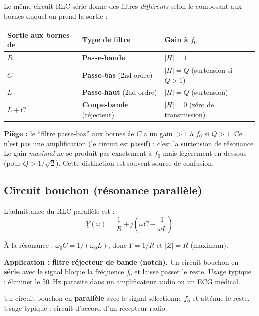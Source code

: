 \documentclass[12pt,a4paper,twoside]{book}
\begin{document}
Le même circuit RLC série donne des filtres \textit{différents} selon le composant aux bornes duquel on prend la sortie :

\begin{center}
\begin{tabular}{lll}
\toprule
\textbf{Sortie aux bornes de} & \textbf{Type de filtre} & \textbf{Gain à $f_0$} \\
\midrule
$R$ & \textbf{Passe-bande} & $|H| = 1$ \\
$C$ & \textbf{Passe-bas} (2nd ordre) & $|H| = Q$ (surtension si $Q > 1$) \\
$L$ & \textbf{Passe-haut} (2nd ordre) & $|H| = Q$ (surtension) \\
$L + C$ & \textbf{Coupe-bande} (réjecteur) & $|H| = 0$ (zéro de transmission) \\
\bottomrule
\end{tabular}
\end{center}

\begin{attention}
\textbf{Piège :} le ``filtre passe-bas'' aux bornes de $C$ a un gain $> 1$ à $f_0$ si $Q > 1$. Ce n'est pas une amplification (le circuit est passif) : c'est la surtension de résonance. Le gain \textit{maximal} ne se produit pas exactement à $f_0$ mais légèrement en dessous (pour $Q > 1/\sqrt{2}$). Cette distinction est souvent source de confusion.
\end{attention}

\subsection{Circuit bouchon (résonance parallèle)}

L'admittance du RLC parallèle est :
\[
\underline{Y}(\omega) = \frac{1}{R} + j\left(\omega C - \frac{1}{\omega L}\right)
\]

À la résonance : $\omega_0 C = 1/(\omega_0 L)$, donc $\underline{Y} = 1/R$ et $|\underline{Z}| = R$ (maximum).

\begin{pratique}
\textbf{Application : filtre réjecteur de bande (notch).} Un circuit bouchon en \textbf{série} avec le signal bloque la fréquence $f_0$ et laisse passer le reste. Usage typique : éliminer le \SI{50}{Hz} parasite dans un amplificateur audio ou un ECG médical.

Un circuit bouchon en \textbf{parallèle} avec le signal sélectionne $f_0$ et atténue le reste. Usage typique : circuit d'accord d'un récepteur radio.
\end{pratique}
\end{document}
